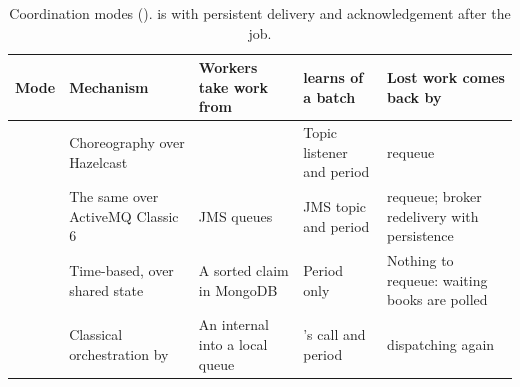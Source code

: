 \begin{table}[ht]
\centering
\small
\caption{Coordination modes ().  is  with persistent delivery and
acknowledgement after the job.}
\label{tab:modes}
\begin{tabularx}{\textwidth}{@{}L{2.55cm}L{3.1cm}L{3.15cm}L{2.9cm}Y@{}}
\toprule
Mode & Mechanism & Workers take work from &  learns of a batch & Lost work comes back by \\
\midrule
{} & Choreography over Hazelcast &  & Topic listener and period &  requeue \\
 & The same over ActiveMQ Classic 6 & JMS queues & JMS topic and period &  requeue; broker redelivery with persistence \\
 & Time-based, over shared state & A sorted claim in MongoDB & Period only & Nothing to requeue: waiting books are polled \\
 & Classical orchestration by  & An internal  into a local queue & 's call and period &  dispatching again \\
\bottomrule
\end{tabularx}
\end{table}
